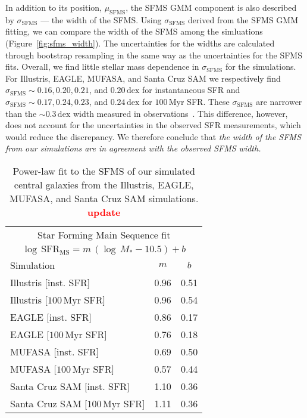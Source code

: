 \documentclass[preprint2,tighten]{aastex62}
\newcommand{\todo}[1]{{\bf \textcolor{red}{ #1}}}
\begin{document}
In addition to its position, $\mu_\mathrm{SFMS}$, the SFMS GMM component 
is also described by $\sigma_\mathrm{SFMS}$ --- the width of the SFMS. 
Using $\sigma_\mathrm{SFMS}$ derived from the SFMS GMM fitting, 
we can compare the width of the SFMS among the simluations 
(Figure~\ref{fig:sfms_width}). The uncertainties for the widths are 
calculated through bootstrap resampling in the same way as the 
uncertainties for the SFMS fits. Overall, we find little stellar mass 
dependence in $\sigma_\mathrm{SFMS}$ for the simulations. For Illustris, 
EAGLE, MUFASA, and Santa Cruz SAM we respectively find 
$\sigma_\mathrm{SFMS} \sim 0.16, 0.20, 0.21$, and $0.20\,\mathrm{dex}$ 
for instantaneous SFR and
$\sigma_\mathrm{SFMS} \sim 0.17, 0.24, 0.23$, and $0.24\,\mathrm{dex}$
for $100\,\mathrm{Myr}$ SFR. These $\sigma_\mathrm{SFMS}$ are narrower 
than the ${\sim}0.3\,\mathrm{dex}$ width measured in 
observations~\citep[\emph{e.g.}][]{daddi2007, noeske2007, magdis2012, whitaker2012}. 
This difference, however, does not account for the uncertainties in the 
observed SFR measurements, which would reduce the discrepancy. We 
therefore conclude that \emph{the width of the SFMS from our 
simulations are in agreement with the observed SFMS width.}


\begin{table}
\caption{Power-law fit to the SFMS of our simulated central galaxies from the
Illustris, EAGLE, MUFASA, and Santa Cruz SAM simulations.\todo{update}} 
\begin{center}
\begin{tabular}{p{5cm}cc} \toprule
\multicolumn{3}{c}{Star Forming Main Sequence fit} \\
\multicolumn{3}{c}{$\log\,\mathrm{SFR}_\mathrm{MS} = m\,(\log\,M_* - 10.5) + b$  } \\ [5pt]
Simulation & $m$ & $b$ \\ 
\hline
Illustris [inst. SFR] & 0.96 & 0.51 \\ 
Illustris [$100\,\mathrm{Myr}$ SFR] & 0.96 & 0.54 \\ [2pt]
EAGLE [inst. SFR] & 0.86 & 0.17 \\ 
EAGLE [$100\,\mathrm{Myr}$ SFR] & 0.76 & 0.18 \\ [2pt]
MUFASA [inst. SFR] & 0.69 & 0.50 \\ 
MUFASA [$100\,\mathrm{Myr}$ SFR] & 0.57 & 0.44 \\ [2pt]
Santa Cruz SAM [inst. SFR] & 1.10 & 0.36 \\ 
Santa Cruz SAM [$100\,\mathrm{Myr}$ SFR] & 1.11 & 0.36 \\ 
\hline
\end{tabular} \label{tab:sfms_powerlaw}
\end{center}
\end{table}
\end{document}
